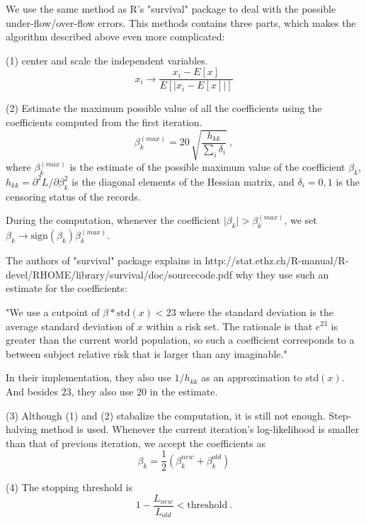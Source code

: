 We use the same method as R's "survival" package to deal with the
possible under-flow/over-flow errors. This methods contains three
parts, which makes the algorithm described above even more
complicated:

(1) center and scale the independent variables.
\begin{equation}
    x_i \rightarrow \frac{x_i - E[x]}{E[\vert x_i - E[x] \vert]}
\end{equation}

(2) Estimate the maximum possible value of all the coefficients using
the coefficients computed from the first iteration.
\begin{equation}
    \beta_k^{(max)} = 20 \, \sqrt{\frac{h_{kk}}{\sum_i \delta_i}}\ ,
\end{equation}
where $\beta_k^{(max)}$ is the estimate of the possible maximum value
of the coefficient $\beta_k$, $h_{kk} = \partial^2 L / \partial
\beta_k^2$ is the diagonal elements of the Hessian matrix, and
$\delta_i=0,1$ is the censoring status of the records.

During the computation, whenever the coefficient $\vert \beta_k \vert
> \beta_k^{(max)}$, we set $\beta_k \rightarrow \mbox{sign}(\beta_k)
\beta_k^{(max)}$.

The authors of "survival" package explains in
http://stat.ethz.ch/R-manual/R-devel/RHOME/library/survival/doc/sourcecode.pdf
why they use such an estimate for the coefficients:

"We use a cutpoint of $\beta * \mbox{std}(x) < 23$
where the standard deviation is the average standard deviation of $x$ within a risk
set. The rationale is that $e^{23}$ is greater than the current world
population, so such a coefficient corresponds to a between subject
relative risk that is larger than any imaginable."

In their implementation, they also use $1/h_{kk}$ as an approximation
to $\mbox{std}(x)$. And besides $23$, they also use $20$ in the
estimate.

(3) Although (1) and (2) stabalize the computation, it is still not
enough. Step-halving method is used. Whenever the current iteration's
log-likelihood is smaller than that of previous iteration, we accept
the coefficients as
\begin{equation}
    \beta_k = \frac{1}{2}(\beta_k^{new} + \beta_k^{old})
\end{equation}

(4) The stopping threshold is
\begin{equation}
    1 - \frac{L_{new}}{L_{old}} < \mbox{threshold}\ .
\end{equation}

